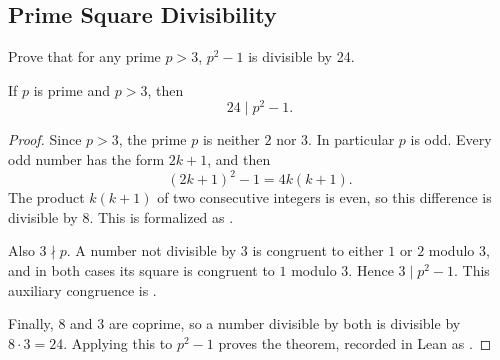 
\subsection{Prime Square Divisibility}

\begin{problemstatement}
Prove that for any prime \(p > 3\), \(p^2-1\) is divisible by 24.
\end{problemstatement}

\begin{theorem}
If \(p\) is prime and \(p>3\), then
\[
  24 \mid p^2-1.
\]
\end{theorem}

\begin{proof}
Since \(p>3\), the prime \(p\) is neither \(2\) nor \(3\). In particular
\(p\) is odd. Every odd number has the form \(2k+1\), and then
\[
  (2k+1)^2-1=4k(k+1).
\]
The product \(k(k+1)\) of two consecutive integers is even, so this difference
is divisible by \(8\). This is formalized as
.

Also \(3\nmid p\). A number not divisible by \(3\) is congruent to either
\(1\) or \(2\) modulo \(3\), and in both cases its square is congruent to
\(1\) modulo \(3\). Hence \(3\mid p^2-1\). This auxiliary congruence is
.

Finally, \(8\) and \(3\) are coprime, so a number divisible by both is divisible
by \(8\cdot 3=24\). Applying this to \(p^2-1\) proves the theorem, recorded in
Lean as .
\end{proof}
